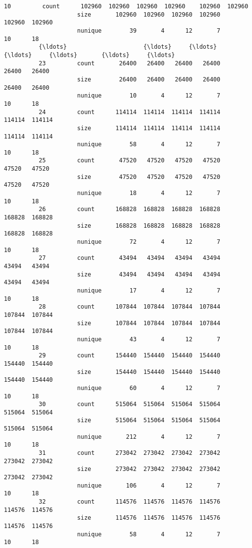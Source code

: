 \documentclass[11pt]{article}
\begin{document}
\begin{Verbatim}[commandchars=\\\{\}]
          10         count      102960  102960  102960  102960    102960  102960   
                     size       102960  102960  102960  102960    102960  102960   
                     nunique        39       4      12       7        10      18   
          {\ldots}                      {\ldots}     {\ldots}     {\ldots}     {\ldots}       {\ldots}     {\ldots}   
          23         count       26400   26400   26400   26400     26400   26400   
                     size        26400   26400   26400   26400     26400   26400   
                     nunique        10       4      12       7        10      18   
          24         count      114114  114114  114114  114114    114114  114114   
                     size       114114  114114  114114  114114    114114  114114   
                     nunique        58       4      12       7        10      18   
          25         count       47520   47520   47520   47520     47520   47520   
                     size        47520   47520   47520   47520     47520   47520   
                     nunique        18       4      12       7        10      18   
          26         count      168828  168828  168828  168828    168828  168828   
                     size       168828  168828  168828  168828    168828  168828   
                     nunique        72       4      12       7        10      18   
          27         count       43494   43494   43494   43494     43494   43494   
                     size        43494   43494   43494   43494     43494   43494   
                     nunique        17       4      12       7        10      18   
          28         count      107844  107844  107844  107844    107844  107844   
                     size       107844  107844  107844  107844    107844  107844   
                     nunique        43       4      12       7        10      18   
          29         count      154440  154440  154440  154440    154440  154440   
                     size       154440  154440  154440  154440    154440  154440   
                     nunique        60       4      12       7        10      18   
          30         count      515064  515064  515064  515064    515064  515064   
                     size       515064  515064  515064  515064    515064  515064   
                     nunique       212       4      12       7        10      18   
          31         count      273042  273042  273042  273042    273042  273042   
                     size       273042  273042  273042  273042    273042  273042   
                     nunique       106       4      12       7        10      18   
          32         count      114576  114576  114576  114576    114576  114576   
                     size       114576  114576  114576  114576    114576  114576   
                     nunique        58       4      12       7        10      18   
          

\end{Verbatim}
\end{document}
